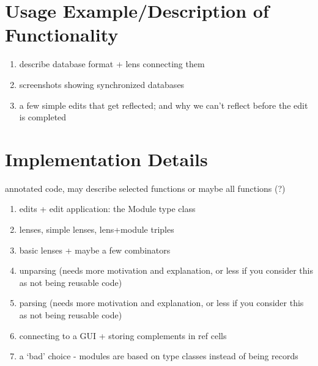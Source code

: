 \section{Usage Example/Description of Functionality}
\label{sec:impl-usage}
\begin{enumerate}
    \item describe database format + lens connecting them
    \item screenshots showing synchronized databases
    \item a few simple edits that get reflected; and why we can't reflect before the edit is completed
\end{enumerate}

\section{Implementation Details}
\label{sec:impl-details}
annotated code, may describe selected functions or maybe all functions (?)
\begin{enumerate}
    \item edits + edit application: the Module type class
    \item lenses, simple lenses, lens+module triples
    \item basic lenses + maybe a few combinators
    \item unparsing (needs more motivation and explanation, or less if you consider this as not being reusable code)
    \item parsing (needs more motivation and explanation, or less if you consider this as not being reusable code)
    \item connecting to a GUI + storing complements in ref cells
    \item a `bad' choice - modules are based on type classes instead of being records
\end{enumerate}

